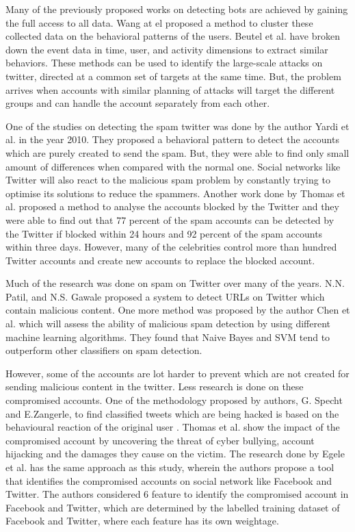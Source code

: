 \documentclass[conference]{IEEEtran}
\begin{document}
Many of the previously proposed works on detecting bots are achieved by gaining the full access to all data. Wang at el proposed a method to cluster these collected data on the behavioral patterns of the users. Beutel et al. have broken down the event data in time, user, and activity dimensions to extract similar behaviors. These methods can be used to identify the large-scale attacks on twitter, directed at a common set of targets at the same time. But, the problem arrives when accounts with similar planning of attacks will target the different groups and can handle the account separately from each other.

One of the studies on detecting the spam twitter was done by the author Yardi et al. \cite{5} in the year 2010. They proposed a behavioral pattern to detect the accounts which are purely created to send the spam. But, they were able to find only small amount of differences when compared with the normal one. Social networks like Twitter will also react to the malicious spam problem by constantly trying to optimise its solutions to reduce the spammers. Another work done by Thomas et al. \cite{6} proposed a method to analyse the accounts blocked by the Twitter and they were able to find out that 77 percent of the spam accounts can be detected by the Twitter if blocked within 24 hours and 92 percent of the spam accounts within three days. However, many of the celebrities control more than hundred Twitter accounts and create new accounts to replace the blocked account.

Much of the research was done on spam on Twitter over many of the years. N.N. Patil, and N.S. Gawale proposed a system to detect URLs on Twitter which contain malicious content\cite{7}. One more method was proposed by the author Chen et al. \cite{8} which will assess the ability of malicious spam detection by using different machine learning algorithms. They found that Naive Bayes and SVM tend to outperform other classifiers on spam detection.

However, some of the accounts are lot harder to prevent which are not created for sending malicious content in the twitter. Less research is done on these compromised accounts. One of the methodology proposed by authors, G. Specht and  E.Zangerle, to find classified tweets which are being hacked is based on the behavioural reaction of the original user \cite{8}. Thomas et al. \cite{9} show the impact of the compromised account by uncovering the threat of cyber bullying, account hijacking and the damages they cause on the victim. The research done by Egele et al. \cite{10}  has the same approach as this study, wherein the authors propose a tool that identifies the compromised accounts on social network like Facebook and Twitter. The authors considered 6 feature to identify the compromised account in Facebook and Twitter, which are determined by the labelled training dataset of Facebook and Twitter, where each feature has its own weightage.
\end{document}
